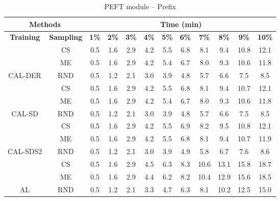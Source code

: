 \begin{table}[htbp]
\begin{subtable}{\linewidth}
\begin{tabular}{c|c|cccccccccc}
\toprule
\multicolumn{2}{c|}{\textbf{Methods}} & \multicolumn{10}{c}{\textbf{Time (min)}} \\
\midrule
\textbf{Training} & \textbf{Sampling} & \textbf{1\%} & \textbf{2\%} & \textbf{3\%} & \textbf{4\%} & \textbf{5\%} & \textbf{6\%} & \textbf{7\%} & \textbf{8\%} & \textbf{9\%} & \textbf{10\%}\\
\midrule
 & CS & 0.5 & 1.6 & 2.9 & 4.2 & 5.5 & 6.8 & 8.1 & 9.4 & 10.8 & 12.1\\

 & ME & 0.5 & 1.6 & 2.9 & 4.2 & 5.4 & 6.7 & 8.0 & 9.3 & 10.6 & 11.8\\

\multirow{-3}{*}{\raggedright\arraybackslash CAL-DER} & RND & 0.5 & 1.2 & 2.1 & 3.0 & 3.9 & 4.8 & 5.7 & 6.6 & 7.5 & 8.5\\
\midrule
 & CS & 0.5 & 1.6 & 2.9 & 4.2 & 5.5 & 6.8 & 8.1 & 9.4 & 10.7 & 12.1\\

 & ME & 0.5 & 1.6 & 2.9 & 4.2 & 5.4 & 6.7 & 8.0 & 9.3 & 10.6 & 11.8\\

\multirow{-3}{*}{\raggedright\arraybackslash CAL-SD} & RND & 0.5 & 1.2 & 2.1 & 3.0 & 3.9 & 4.8 & 5.7 & 6.6 & 7.5 & 8.5\\
\midrule
 & CS & 0.5 & 1.6 & 2.9 & 4.2 & 5.5 & 6.9 & 8.2 & 9.5 & 10.8 & 12.1\\

 & ME & 0.5 & 1.6 & 2.9 & 4.2 & 5.5 & 6.8 & 8.1 & 9.4 & 10.7 & 11.9\\

\multirow{-3}{*}{\raggedright\arraybackslash CAL-SDS2} & RND & 0.5 & 1.2 & 2.1 & 3.0 & 3.9 & 4.9 & 5.8 & 6.7 & 7.6 & 8.6\\
\midrule
 & CS & 0.5 & 1.6 & 2.9 & 4.5 & 6.3 & 8.3 & 10.6 & 13.1 & 15.8 & 18.7\\

 & ME & 0.5 & 1.6 & 2.9 & 4.4 & 6.2 & 8.2 & 10.4 & 12.9 & 15.6 & 18.5\\

\multirow{-3}{*}{\raggedright\arraybackslash AL} & RND & 0.5 & 1.2 & 2.1 & 3.3 & 4.7 & 6.3 & 8.1 & 10.2 & 12.5 & 15.0\\
\bottomrule
\end{tabular}
\end{subtable}
\vspace{1em}
\begin{subtable}{\linewidth}
\centering
\caption{PEFT module -- Prefix}


\end{subtable}
\end{table}
